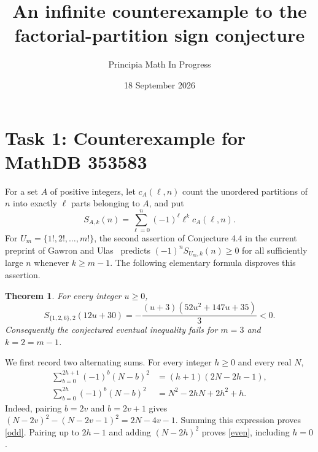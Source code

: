 \documentclass[11pt]{article}
\title{An infinite counterexample to the factorial-partition sign conjecture}
\author{Principia Math In Progress}
\date{18 September 2026}
\newtheorem{theorem}{Theorem}
\begin{document}
\maketitle

\section*{Task 1: Counterexample for MathDB 353583}
For a set $A$ of positive integers, let $c_A(\ell,n)$ count the
unordered partitions of $n$ into exactly $\ell$ parts belonging to $A$,
and put
\[
 S_{A,k}(n)=\sum_{\ell=0}^n(-1)^\ell\ell^k c_A(\ell,n).
\]
For $U_m=\{1!,2!,\ldots,m!\}$, the second assertion of Conjecture 4.4
in the current preprint of Gawron and Ulas~\cite{GU} predicts
$(-1)^n S_{U_m,k}(n)\geq0$ for all sufficiently large $n$ whenever
$k\geq m-1$. The following elementary formula disproves this assertion.

\begin{theorem}
For every integer $u\geq0$,
\begin{equation}\label{counter}
 S_{\{1,2,6\},2}(12u+30)
 =-\frac{(u+3)(52u^2+147u+35)}3<0.
\end{equation}
Consequently the conjectured eventual inequality fails for
$m=3$ and $k=2=m-1$.
\end{theorem}

We first record two alternating sums. For every integer $h\geq0$
and every real $N$,
\begin{align}
 \sum_{b=0}^{2h+1}(-1)^b(N-b)^2
   &=(h+1)(2N-2h-1),\label{odd}\\
 \sum_{b=0}^{2h}(-1)^b(N-b)^2
   &=N^2-2hN+2h^2+h.\label{even}
\end{align}
Indeed, pairing $b=2v$ and $b=2v+1$ gives
$(N-2v)^2-(N-2v-1)^2=2N-4v-1$.
Summing this expression proves \eqref{odd}. Pairing up to $2h-1$
and adding $(N-2h)^2$ proves \eqref{even}, including $h=0$.
\end{document}
